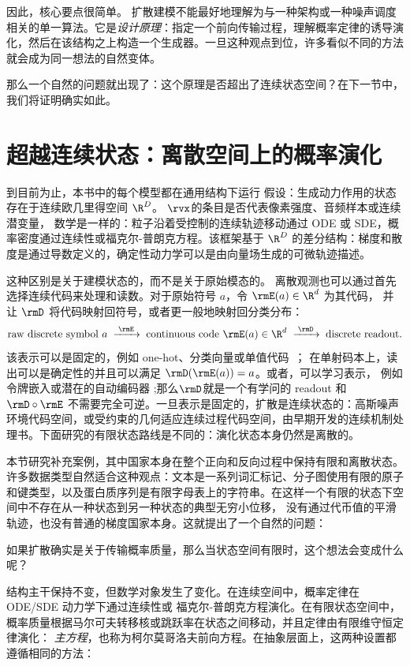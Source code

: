 因此，核心要点很简单。
扩散建模不能最好地理解为与一种架构或一种噪声调度相关的单一算法。它是\emph{设计原理}：指定一个前向传输过程，理解概率定律的诱导演化，然后在该结构之上构造一个生成器。一旦这种观点到位，许多看似不同的方法就会成为同一想法的自然变体。

那么一个自然的问题就出现了：这个原理是否超出了连续状态空间？在下一节中，我们将证明确实如此。


\section{超越连续状态：离散空间上的概率演化}
\label{sec:epilogue-discrete}到目前为止，本书中的每个模型都在通用结构下运行
假设：生成动力作用的状态存在于连续欧几里得空间 $\R^D$。 $\rvx$的条目是否代表像素强度、音频样本或连续潜变量，
数学是一样的：粒子沿着受控制的连续轨迹移动通过 ODE 或 SDE，概率密度通过连续性或福克尔-普朗克方程。该框架基于 $\R^D$ 的差分结构：梯度和散度是通过导数定义的，确定性动力学可以是由向量场生成的可微轨迹描述。

这种区别是关于建模状态的，而不是关于原始模态的。
离散观测也可以通过首先选择连续代码来处理和读数。对于原始符号 $a$，令 $\rmE(a)\in\R^d$ 为其代码，
并让 $\rmD$ 将代码映射回符号，或者更一般地映射回分类分布：
\[
\text{raw discrete symbol } a
\;\xrightarrow{\;\rmE\;}\;
\text{continuous code } \rmE(a)\in\R^d
\;\xrightarrow{\;\rmD\;}\;
\text{discrete readout}.
\]
该表示可以是固定的，例如 one-hot、分类向量或单值代码~\citep{richemond2022categorical}；
在单射码本上，读出可以是确定性的并且可以满足
$\rmD(\rmE(a))=a$。或者，可以学习表示，
例如令牌嵌入或潜在的自动编码器
\citep{li2022diffusionlm,dieleman2022continuous};那么$\rmD$就是一个有学问的
readout 和 $\rmD\circ\rmE$ 不需要完全可逆。一旦表示是固定的，扩散是连续状态的：高斯噪声环境代码空间，或受约束的几何适应连续过程代码空间，由早期开发的连续机制处理书。下面研究的有限状态路线是不同的：演化状态本身仍然是离散的。

本节研究补充案例，其中国家本身在整个正向和反向过程中保持有限和离散状态。许多数据类型自然适合这种观点：文本是一系列词汇标记、分子图使用有限的原子和键类型，以及蛋白质序列是有限字母表上的字符串。在这样一个有限的状态下空间中不存在从一种状态到另一种状态的典型无穷小位移，
没有通过代币值的平滑轨迹，也没有普通的梯度国家本身。这就提出了一个自然的问题：
\begin{question}
    如果扩散确实是关于传输概率质量，那么当状态空间有限时，这个想法会变成什么呢？
\end{question}

结构主干保持不变，但数学对象发生了变化。在连续空间中，概率定律在 ODE/SDE 动力学下通过连续性或 福克尔-普朗克方程演化。在有限状态空间中，概率质量根据马尔可夫转移核或跳跃率在状态之间移动，并且定律由有限维守恒定律演化： \emph{主方程}，也称为柯尔莫哥洛夫前向方程。在抽象层面上，这两种设置都遵循相同的方法：


